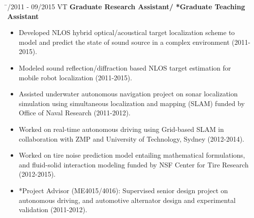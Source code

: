 \documentclass[11pt,letter]{article}
\begin{document}
\begin{tabbing}
	\hspace{3cm} \= /2011 - 09/2015 \> VT {\bf Graduate Research Assistant/ *Graduate Teaching Assistant}\\
	\>\hspace{-2cm}\begin{minipage}{0.9\textwidth}
		\begin{itemize}
			\item Developed NLOS hybrid optical/acoustical target localization scheme to model and predict the state of sound source in a complex environment (2011-2015).
			\item Modeled sound reflection/diffraction based NLOS target estimation for mobile robot localization (2011-2015).
			\item Assisted underwater autonomous navigation project on sonar localization simulation using simultaneous localization and mapping (SLAM) funded by Office of Naval Research (2011-2012).
			\item Worked on real-time autonomous driving using Grid-based SLAM in collaboration with ZMP and University of Technology, Sydney (2012-2014).
			\item Worked on tire noise prediction model entailing mathematical formulations, and fluid-solid interaction modeling funded by NSF Center for Tire Research (2012-2015).
			\item *Project Advisor (ME4015/4016): Supervised senior design project on autonomous driving, and automotive alternator design and experimental validation (2011-2012).
		\end{itemize}
	\end{minipage}
\end{tabbing}
\end{document}
